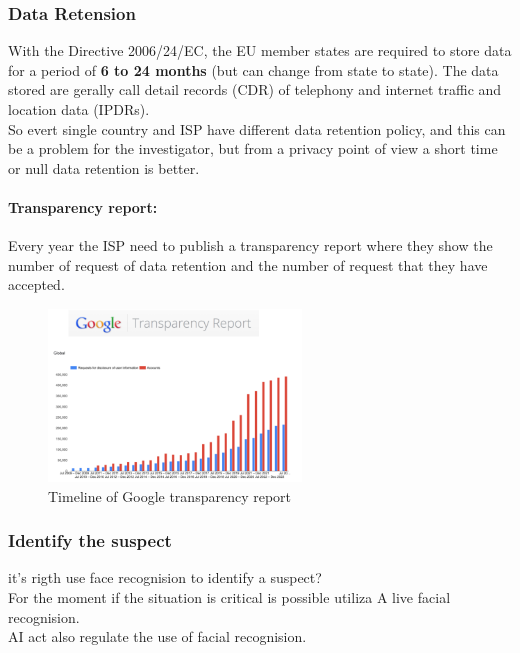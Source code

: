 \subsubsection{Data Retension}
With the Directive 2006/24/EC, the EU member states are required to store data for 
a period of \textbf{6 to 24 months} (but can change from state to state). 
The data stored are gerally call detail records (CDR) of 
telephony and internet traffic and location data (IPDRs). \\
So evert single country and ISP have different data retention policy, and 
this can be a problem for the investigator, but from a privacy point of view a short time 
or null data retention is better.

\newpage

\paragraph{Transparency report:} Every year the ISP need to publish a transparency report 
where they show the number of request of data retention and the number of request that they 
have accepted.

\begin{figure}[h!]
    \centering
    \includegraphics[width=0.6\textwidth]{img/transp_report.png}
    \caption{Timeline of Google transparency report}
    \label{fig:transparency report}
 \end{figure}

\subsubsection{Identify the suspect}
it's rigth use face recognision to identify a suspect? \\ 
For the moment if the situation is critical is possible utiliza A
live facial recognision. \\ 
AI act also regulate the use of facial recognision. %

